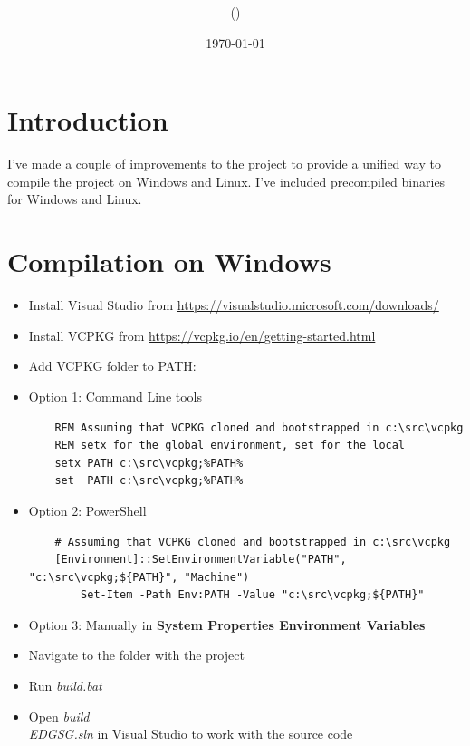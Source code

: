 \documentclass[12pt,a4paper,english]{article}
\title{\mySubject\\\myTitle}
\author{\myName (\myEmail)}
\date{\today}
\begin{document}
\section{Introduction}
I've made a couple of improvements to the project to provide a unified way to compile the project on Windows and Linux.
I've included precompiled binaries for Windows and Linux.

\section{Compilation on Windows}

\begin{itemize}
    \item Install Visual Studio from \url{https://visualstudio.microsoft.com/downloads/}
    \item Install VCPKG from \url{https://vcpkg.io/en/getting-started.html}
    \item Add VCPKG folder to PATH:
    \item Option 1: Command Line tools

    \begin{verbatim}
    REM Assuming that VCPKG cloned and bootstrapped in c:\src\vcpkg
    REM setx for the global environment, set for the local
    setx PATH c:\src\vcpkg;%PATH%
    set  PATH c:\src\vcpkg;%PATH%
    \end{verbatim}

    \item Option 2: PowerShell
    \begin{verbatim}
    # Assuming that VCPKG cloned and bootstrapped in c:\src\vcpkg
    [Environment]::SetEnvironmentVariable("PATH", "c:\src\vcpkg;${PATH}", "Machine")
        Set-Item -Path Env:PATH -Value "c:\src\vcpkg;${PATH}"
    \end{verbatim}

    \item Option 3: Manually in \textbf{System Properties \text{-->} Environment Variables}
    \item Navigate to the folder with the project
    \item Run \textit{build.bat}
    \item Open \textit{build\\EDGSG.sln} in Visual Studio to work with the source code
\end{itemize}
\end{document}
